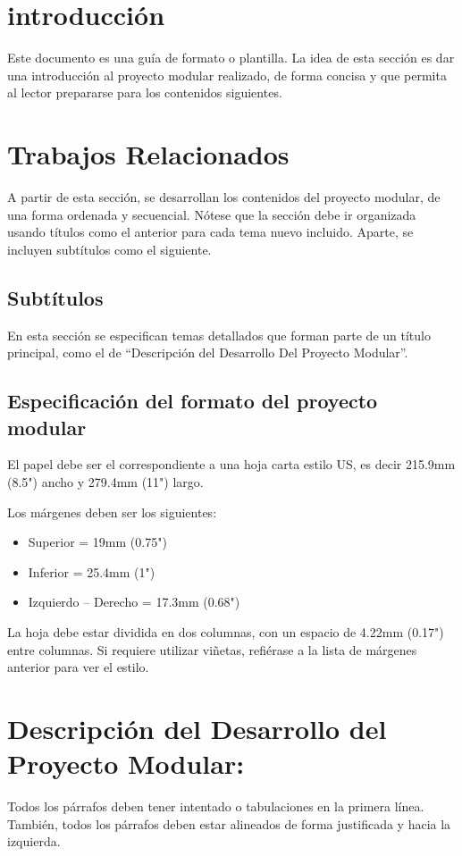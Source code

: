 \section{introducción}
Este documento es una guía de formato o plantilla. La idea de esta sección es dar
una introducción al proyecto modular realizado, de forma concisa y que permita
al lector prepararse para los contenidos siguientes.

\section{Trabajos Relacionados}
A partir de esta sección, se desarrollan los contenidos del proyecto modular, de
una forma ordenada y secuencial. Nótese que la sección debe ir organizada usando
títulos como el anterior para cada tema nuevo incluido. Aparte, se incluyen subtítulos
como el siguiente.

\subsection{Subtítulos}
En esta sección se especifican temas detallados que forman parte de un título principal,
como el de “Descripción del Desarrollo Del Proyecto Modular”.

\subsection{Especificación del formato del proyecto modular}
El papel debe ser el correspondiente a una hoja carta estilo US, es decir 215.9mm
(8.5") ancho y 279.4mm (11") largo.

Los márgenes deben ser los siguientes:

\begin{itemize}
	\item Superior = 19mm (0.75")

	\item Inferior = 25.4mm (1")

	\item Izquierdo – Derecho = 17.3mm (0.68")
\end{itemize}

La hoja debe estar dividida en dos columnas, con un espacio de 4.22mm (0.17") entre
columnas. Si requiere utilizar viñetas, refiérase a la lista de márgenes anterior
para ver el estilo.

\section{Descripción del Desarrollo del Proyecto Modular:\;}
Todos los párrafos deben tener intentado o tabulaciones en la primera línea.
También, todos los párrafos deben estar alineados de forma justificada y hacia la
izquierda.


